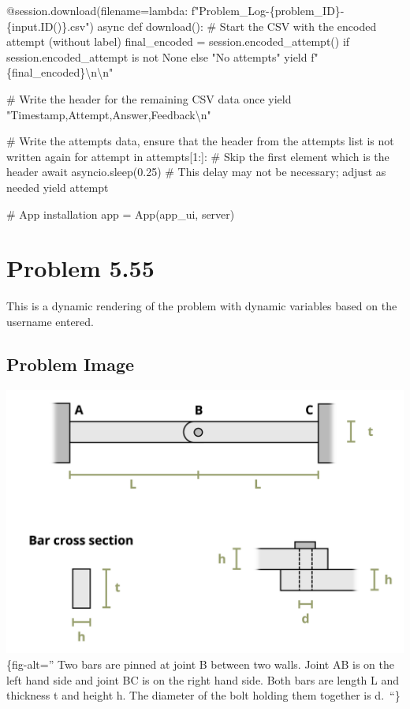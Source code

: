 \documentclass[
  letterpaper,
  DIV=11,
  numbers=noendperiod]{scrreprt}
\newenvironment{Shaded}{\begin{snugshade}}{\end{snugshade}}
\newcommand{\NormalTok}[1]{\textcolor[rgb]{0.00,0.23,0.31}{#1}}
\begin{document}
\begin{Shaded}
\begin{Highlighting}[]
\NormalTok{    @session.download(filename=lambda: f"Problem\_Log{-}\{problem\_ID\}{-}\{input.ID()\}.csv")}
\NormalTok{    async def download():}
\NormalTok{        \# Start the CSV with the encoded attempt (without label)}
\NormalTok{        final\_encoded = session.encoded\_attempt() if session.encoded\_attempt is not None else "No attempts"}
\NormalTok{        yield f"\{final\_encoded\}\textbackslash{}n\textbackslash{}n"}
        
\NormalTok{        \# Write the header for the remaining CSV data once}
\NormalTok{        yield "Timestamp,Attempt,Answer,Feedback\textbackslash{}n"}
        
\NormalTok{        \# Write the attempts data, ensure that the header from the attempts list is not written again}
\NormalTok{        for attempt in attempts[1:]:  \# Skip the first element which is the header}
\NormalTok{            await asyncio.sleep(0.25)  \# This delay may not be necessary; adjust as needed}
\NormalTok{            yield attempt}


\NormalTok{\# App installation}
\NormalTok{app = App(app\_ui, server)}
\end{Highlighting}
\end{Shaded}

\chapter*{Problem 5.55}\label{problem-5.55}


This is a dynamic rendering of the problem with dynamic variables based
on the username entered.

\section*{Problem Image}\label{problem-image-37}


\includegraphics{images/249.png}\{fig-alt='' Two bars are pinned at
joint B between two walls. Joint AB is on the left hand side and joint
BC is on the right hand side. Both bars are length L and thickness t and
height h. The diameter of the bolt holding them together is d.~``\}
\end{document}
